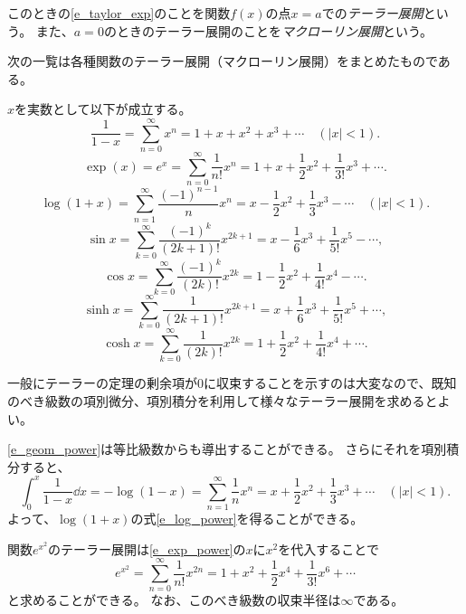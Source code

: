 このときの\eqref{e_taylor_exp}のことを関数$f(x)$の点$x = a$での\emph{テーラー展開}という。
また、$a = 0$のときのテーラー展開のことを\emph{マクローリン展開}という。

次の一覧は各種関数のテーラー展開（マクローリン展開）をまとめたものである。

\begin{proposition}[種々の関数のテーラー展開]
$x$を実数として以下が成立する。
\begin{equation}
\label{e_geom_power}
\frac{1}{1-x} = \sum_{n = 0}^\infty x^n = 1+x+x^2+x^3+\cdots \quad (|x| < 1).
\end{equation}
\begin{equation}
\label{e_exp_power}
\exp(x) = e^x = \sum_{n = 0}^\infty \frac{1}{n!}x^n = 1+x+\frac{1}{2}x^2+\frac{1}{3!}x^3+\cdots.
\end{equation}
\begin{equation}
\label{e_log_power}
\log(1+x) = \sum_{n = 1}^\infty \frac{(-1)^{n-1}}{n}x^n = x-\frac{1}{2}x^2+\frac{1}{3}x^3-\cdots \quad (|x| < 1).
\end{equation}
$$
\sin x = \sum_{k = 0}^\infty \frac{(-1)^k}{(2 k+1)!}x^{2 k+1} = x-\frac{1}{6}x^3+\frac{1}{5!}x^5-\cdots,
$$
$$
\cos x = \sum_{k = 0}^\infty \frac{(-1)^k}{(2 k)!}x^{2 k} = 1-\frac{1}{2}x^2+\frac{1}{4!}x^4-\cdots.
$$
$$
\sinh x = \sum_{k = 0}^\infty \frac{1}{(2 k+1)!}x^{2 k+1} = x+\frac{1}{6}x^3+\frac{1}{5!}x^5+\cdots,
$$
$$
\cosh x = \sum_{k = 0}^\infty \frac{1}{(2 k)!}x^{2 k} = 1+\frac{1}{2}x^2+\frac{1}{4!}x^4+\cdots.
$$
\end{proposition}

一般にテーラーの定理の剰余項が$0$に収束することを示すのは大変なので、既知のべき級数の項別微分、項別積分を利用して様々なテーラー展開を求めるとよい。

\begin{remark}
\eqref{e_geom_power}は等比級数からも導出することができる。
さらにそれを項別積分すると、
$$
\int_0^x \frac{1}{1-x}\dd{x} = -\log(1-x) = \sum_{n = 1}^\infty \frac{1}{n}x^n = x+\frac{1}{2}x^2+\frac{1}{3}x^3+\cdots \quad (|x| < 1).
$$
よって、$\log(1+x)$の式\eqref{e_log_power}を得ることができる。
\end{remark}

\begin{example}
関数$e^{x^2}$のテーラー展開は\eqref{e_exp_power}の$x$に$x^2$を代入することで
$$
e^{x^2} = \sum_{n = 0}^\infty \frac{1}{n!}x^{2 n} = 1+x^2+\frac{1}{2}x^4+\frac{1}{3!}x^6+\cdots
$$
と求めることができる。
なお、このべき級数の収束半径は$\infty$である。
\end{example}
